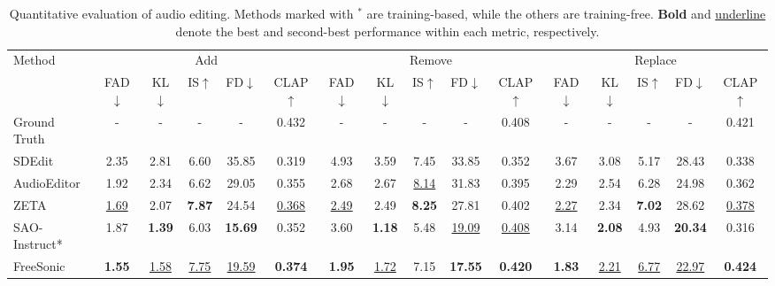 \begin{table}
\centering
\scriptsize
\caption{Quantitative evaluation of audio editing. Methods marked with $^*$ are training-based, while the others are training-free. \textbf{Bold} and \underline{underline} denote the best and second-best performance within each metric, respectively.}
\begin{tabular}{l|ccccc|ccccc|ccccc}
\toprule
\multirow{2}{*}{Method} 
& \multicolumn{5}{c|}{Add} 
& \multicolumn{5}{c|}{Remove} 
& \multicolumn{5}{c}{Replace} \\
\cmidrule(lr){2-6} \cmidrule(lr){7-11} \cmidrule(lr){12-16}
& FAD$\downarrow$ & KL$\downarrow$ & IS$\uparrow$ & FD$\downarrow$ & CLAP$\uparrow$ 
& FAD$\downarrow$ & KL$\downarrow$ & IS$\uparrow$ & FD$\downarrow$ & CLAP$\uparrow$ 
& FAD$\downarrow$ & KL$\downarrow$ & IS$\uparrow$ & FD$\downarrow$ & CLAP$\uparrow$ \\ 
\midrule
Ground Truth & - & - & - & - & 0.432 & - & - & - & - & 0.408 & - & - & - & - & 0.421 \\
\midrule
SDEdit       & 2.35 & 2.81 & 6.60 & 35.85 & 0.319 & 4.93 & 3.59 & 7.45 & 33.85 & 0.352 & 3.67 & 3.08 & 5.17 & 28.43 & 0.338 \\
AudioEditor  & 1.92 & 2.34 & 6.62 & 29.05 & 0.355 & 2.68 & 2.67 & \underline{8.14} & 31.83 & 0.395 & 2.29 & 2.54 & 6.28 & 24.98 & 0.362 \\
ZETA         & \underline{1.69} & 2.07 & \textbf{7.87} & 24.54 & \underline{0.368} & \underline{2.49} & 2.49 & \textbf{8.25} & 27.81 & 0.402 & \underline{2.27} & 2.34 & \textbf{7.02} & 28.62 & \underline{0.378} \\
SAO-Instruct* & 1.87 & \textbf{1.39} & 6.03 & \textbf{15.69} & 0.352 & 3.60 & \textbf{1.18} & 5.48 & \underline{19.09} & \underline{0.408} & 3.14 & \textbf{2.08} & 4.93 & \textbf{20.34} & 0.316 \\
FreeSonic    & \textbf{1.55} & \underline{1.58} & \underline{7.75} & \underline{19.59} & \textbf{0.374} & \textbf{1.95} & \underline{1.72} & 7.15 & \textbf{17.55} & \textbf{0.420} & \textbf{1.83} & \underline{2.21} & \underline{6.77} & \underline{22.97} & \textbf{0.424} \\
\bottomrule
\end{tabular}
\label{tab:obj}
\end{table}

